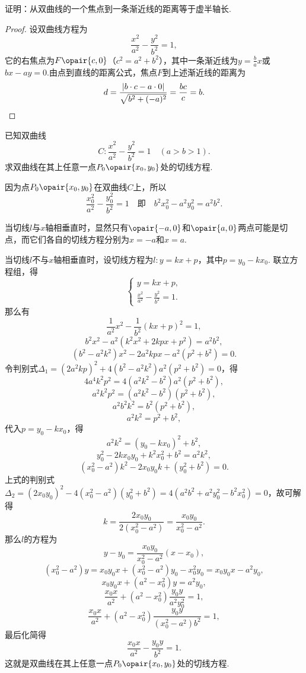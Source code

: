 \begin{example}
证明：从双曲线的一个焦点到一条渐近线的距离等于虚半轴长.
\begin{proof}
设双曲线方程为\[
\frac{x^2}{a^2}-\frac{y^2}{b^2}=1,
\]它的右焦点为\(F\opair{c,0}\)（\(c^2=a^2+b^2\)），其中一条渐近线为\(y=\frac{b}{a}x\)或\(bx-ay=0\).由点到直线的距离公式，焦点\(F\)到上述渐近线的距离为\[
d = \frac{\abs{b \cdot c - a \cdot 0}}{\sqrt{b^2+(-a)^2}}
= \frac{bc}{c} = b.
\qedhere
\]
\end{proof}
\end{example}

\begin{example}
已知双曲线\[
C: \frac{x^2}{a^2} - \frac{y^2}{b^2} = 1 \quad(a>b>1).
\]求双曲线在其上任意一点\(P_0\opair{x_0,y_0}\)处的切线方程.
\begin{solution}
因为点\(P_0\opair{x_0,y_0}\)在双曲线\(C\)上，所以\[
\frac{x_0^2}{a^2} - \frac{y_0^2}{b^2} = 1
\quad\text{即}\quad
b^2 x_0^2 - a^2 y_0^2 = a^2 b^2.
\]

当切线\(l\)与\(x\)轴相垂直时，显然只有\(\opair{-a,0}\)和\(\opair{a,0}\)两点可能是切点，而它们各自的切线方程分别为\(x=-a\)和\(x=a\).

当切线\(l\)不与\(x\)轴相垂直时，设切线方程为\(l: y = kx + p\)，其中\(p = y_0 - k x_0\).
联立方程组，得\[
\begin{cases}
y = kx + p, \\
\frac{x^2}{a^2} - \frac{y^2}{b^2} = 1.
\end{cases}
\]那么有\[
\frac{1}{a^2} x^2 - \frac{1}{b^2} (kx+p)^2 = 1,
\]\[
b^2 x^2 - a^2 (k^2 x^2 + 2kpx + p^2) = a^2 b^2,
\]\[
(b^2 - a^2 k^2) x^2 - 2 a^2 k p x - a^2 (p^2 + b^2) = 0.
\]令判别式\(\Delta_1 = (2 a^2 k p)^2 + 4 (b^2 - a^2 k^2) a^2 (p^2 + b^2) = 0\)，得\[
4 a^4 k^2 p^2 = 4 (a^2 k^2 - b^2) a^2 (p^2 + b^2),
\]\[
a^2 k^2 p^2 = (a^2 k^2 - b^2)(p^2 + b^2),
\]\[
a^2 b^2 k^2 = b^2(p^2 + b^2),
\]\[
a^2 k^2 = p^2 + b^2,
\]
代入\(p = y_0 - k x_0\)，得\[
a^2 k^2 = (y_0 - k x_0)^2 + b^2,
\]\[
y_0^2 - 2k x_0 y_0 + k^2 x_0^2 + b^2 = a^2 k^2,
\]\[
(x_0^2 - a^2) k^2 - 2 x_0 y_0 k + (y_0^2 + b^2) = 0.
\]上式的判别式\(\Delta_2 = (2 x_0 y_0)^2 - 4(x_0^2 - a^2)(y_0^2 + b^2)
= 4(a^2 b^2 + a^2 y_0^2 - b^2 x_0^2) = 0\)，故可解得\[
k = \frac{2 x_0 y_0}{2 (x_0^2 - a^2)}
= \frac{x_0 y_0}{x_0^2 - a^2}.
\]那么\(l\)的方程为\[
y - y_0 = \frac{x_0 y_0}{x_0^2 - a^2} (x - x_0),
\]\[
(x_0^2 - a^2) y = x_0 y_0 x + (x_0^2 - a^2) y_0 - x_0^2 y_0
= x_0 y_0 x - a^2 y_0,
\]\[
x_0 y_0 x + (a^2 - x_0^2) y = a^2 y_0,
\]\[
\frac{x_0 x}{a^2} + (a^2 - x_0^2) \frac{y_0 y}{a^2 y_0^2} = 1,
\]\[
\frac{x_0 x}{a^2} + (a^2 - x_0^2) \frac{y_0 y}{(x_0^2 - a^2) b^2} = 1,
\]最后化简得\begin{equation}\label{equation:解析几何.双曲线的切线}
\frac{x_0 x}{a^2} - \frac{y_0 y}{b^2} = 1.
\end{equation}
这就是双曲线在其上任意一点\(P_0\opair{x_0,y_0}\)处的切线方程.
\end{solution}
\end{example}

